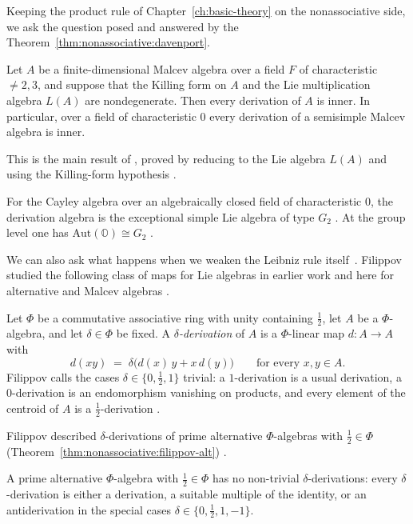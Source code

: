 Keeping the product rule of Chapter~\ref{ch:basic-theory} on the
nonassociative side, we ask the question posed and answered by the
Theorem~\ref{thm:nonassociative:davenport}.

\begin{theorem}
\label{thm:nonassociative:davenport}
Let $A$ be a finite-dimensional Malcev algebra over a field $F$ of
characteristic $\neq 2,3$, and suppose that the Killing form on $A$ and
the Lie multiplication algebra $L(A)$ are nondegenerate. Then every
derivation of $A$ is inner. In particular, over a field of
characteristic $0$ every derivation of a semisimple Malcev algebra is
inner.
\end{theorem}

This is the main result of \cite{Davenport1972Malcev}, proved by
reducing to the Lie algebra $L(A)$ and using the Killing-form hypothesis
\cite[p.~565]{Davenport1972Malcev}.

For the Cayley algebra over an algebraically closed field of
characteristic $0$, the derivation algebra is the exceptional simple Lie
algebra of type $G_{2}$ \cite[p.~52]{McCrimmon2004Taste}. At the group
level one has $\mathrm{Aut}(\mathbb{O})\cong G_2$
\cite[p.~159]{Baez2002Octonions}.

We can also ask what happens when we weaken the Leibniz rule itself~\cite[Introduction, p.~354]{Filippov2000DeltaAlternative}.
Filippov studied the following class of maps for Lie algebras in earlier
work and here for alternative and Malcev algebras
\cite[Introduction, p.~354]{Filippov2000DeltaAlternative}.

\begin{definition}
\label{def:nonassociative:delta-derivation}
Let $\Phi$ be a commutative associative ring with unity containing
$\tfrac12$, let $A$ be a $\Phi$-algebra, and let $\delta\in\Phi$ be
fixed. A \emph{$\delta$-derivation} of $A$ is a $\Phi$-linear map
$d\colon A\to A$ with
\[
d(xy)\;=\;\delta\bigl(d(x)\,y+x\,d(y)\bigr)
\qquad\text{for every }x,y\in A.
\]
Filippov calls the cases $\delta\in\{0,\tfrac12,1\}$ trivial: a
$1$-derivation is a usual derivation, a $0$-derivation is an
endomorphism vanishing on products, and every element of the centroid
of $A$ is a $\tfrac12$-derivation
\cite[Introduction, p.~354]{Filippov2000DeltaAlternative}.
\end{definition}

Filippov described $\delta$-derivations of prime alternative
$\Phi$-algebras with $\tfrac12\in\Phi$ (Theorem~\ref{thm:nonassociative:filippov-alt})
\cite[Theorem~2, p.~356]{Filippov2000DeltaAlternative}.\begin{theorem}
\label{thm:nonassociative:filippov-alt}
A prime alternative $\Phi$-algebra with $\tfrac{1}{2}\in\Phi$ has no
non-trivial $\delta$-derivations: every $\delta$-derivation is either a
derivation, a suitable multiple of the identity, or an antiderivation
in the special cases $\delta\in\{0,\tfrac12,1,-1\}$.
\end{theorem}

